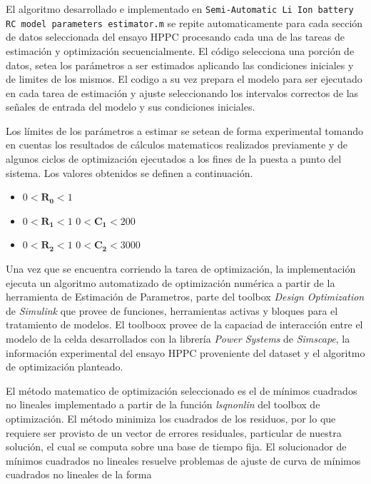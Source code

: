 \documentclass[10pt, a4paper]{report}
\begin{document}
El algoritmo desarrollado e implementado en \texttt{Semi-Automatic Li Ion
battery RC model parameters estimator.m} se repite automaticamente para cada
sección de datos seleccionada del ensayo \acrshort{HPPC} procesando cada una de
las tareas de estimación y optimización secuencialmente. El código selecciona
una porción de datos, setea los parámetros a ser estimados aplicando las
condiciones iniciales y de limites de los mismos. El codigo a su vez prepara el
modelo para ser ejecutado en cada tarea de estimación y ajuste seleccionando los
intervalos correctos de las señales de entrada del modelo y sus condiciones
iniciales.

Los límites de los parámetros a estimar se setean de forma experimental tomando
en cuentas los resultados de cálculos matematicos realizados previamente y de
algunos ciclos de optimización ejecutados a los fines de la puesta a punto del
sistema. Los valores obtenidos se definen a continuación. 

\begin{itemize}
    \item [] $ 0 < \mathbf{R_0} < 1$
    \item [] $ 0 < \mathbf{R_1} < 1$ $ 0 < \mathbf{C_1} < 200$
    \item [] $ 0 < \mathbf{R_2} < 1$ $ 0 < \mathbf{C_2} < 3000$
\end{itemize}
\FloatBarrier

Una vez que se encuentra corriendo la tarea de optimización, la implementación
ejecuta un algoritmo automatizado de optimización numérica a partir de la
herramienta de Estimación de Parametros, parte del toolbox \emph{Design
Optimization} de \emph{Simulink} que provee de funciones, herramientas activas
y bloques para el tratamiento de modelos. El toolboox provee de la capaciad de
interacción entre el modelo de la celda desarrollados con la librer\'ia
\emph{Power Systems} de \emph{Simscape}, la información experimental del ensayo
\acrshort{HPPC} proveniente del dataset y el algoritmo de optimización planteado.

El método matematico de optimización seleccionado es el de mínimos cuadrados no
lineales implementado a partir de la función \emph{lsqnonlin} del toolbox de
optimización. 
El método minimiza los cuadrados de los residuos, por lo que requiere ser
provisto de un vector de errores residuales, particular de nuestra solución, el
cual se computa sobre una base de tiempo fija.
El solucionador de mínimos cuadrados no lineales resuelve problemas de ajuste de
curva de mínimos cuadrados no lineales de la forma
\end{document}
